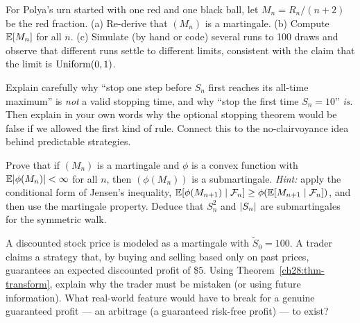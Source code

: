 \begin{exercise}
\label{ch28:exer-polya}
For Polya's urn started with one red and one black ball, let $M_n = R_n/(n+2)$ be the red fraction.
(a) Re-derive that $(M_n)$ is a martingale. (b) Compute $\operatorname{\mathbb{E}}[M_n]$ for all $n$. (c) Simulate (by hand or
code) several runs to 100 draws and observe that different runs settle to different limits, consistent
with the claim that the limit is $\operatorname{Uniform}(0,1)$.
\end{exercise}

\begin{exercise}
\label{ch28:exer-stopping}
Explain carefully why ``stop one step before $S_n$ first reaches its all-time maximum'' is \emph{not} a
valid stopping time, and why ``stop the first time $S_n = 10$'' \emph{is}. Then explain in your own
words why the optional stopping theorem would be false if we allowed the first kind of rule. Connect
this to the no-clairvoyance idea behind predictable strategies.
\end{exercise}

\begin{exercise}
\label{ch28:exer-proof}
Prove that if $(M_n)$ is a martingale and $\phi$ is a convex function with $\operatorname{\mathbb{E}}\lvert\phi(M_n)\rvert < \infty$
for all $n$, then $(\phi(M_n))$ is a submartingale. \emph{Hint:} apply the conditional form of Jensen's
inequality, $\operatorname{\mathbb{E}}[\phi(M_{n+1})\mid\mathcal{F}_n] \ge \phi(\operatorname{\mathbb{E}}[M_{n+1}\mid\mathcal{F}_n])$, and then
use the martingale property. Deduce that $S_n^2$ and $\lvert S_n\rvert$ are submartingales for the symmetric
walk.
\end{exercise}

\begin{exercise}
\label{ch28:exer-finance}
A discounted stock price is modeled as a martingale with $\tilde{S}_0 = 100$. A trader claims a
strategy that, by buying and selling based only on past prices, guarantees an expected discounted
profit of \$$5$. Using Theorem~\ref{ch28:thm-transform}, explain why the trader must be mistaken (or
using future information). What real-world feature would have to break for a genuine guaranteed
profit --- an arbitrage (a guaranteed risk-free profit) --- to exist?
\end{exercise}
